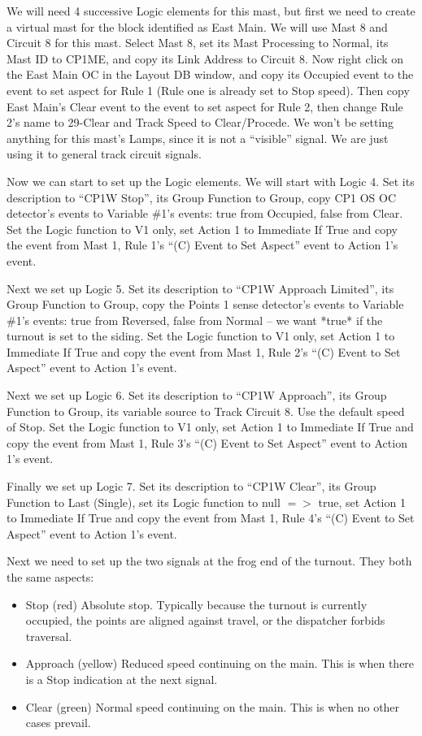 We will need 4 successive Logic elements for this mast, but first we need to 
create a virtual mast for the block identified as East Main.  We will use Mast 
8 and Circuit 8 for this mast.  Select Mast 8, set its Mast Processing to 
Normal, its Mast ID to CP1ME, and copy its Link Address to Circuit 8.  Now 
right click on the East Main OC in the Layout DB window, and copy its Occupied 
event to the event to set aspect for Rule 1 (Rule one is already set to Stop 
speed).  Then copy East Main's Clear event to the event to set aspect for Rule 
2, then change Rule 2's name to 29-Clear and Track Speed to Clear/Procede.  We 
won't be setting anything for this mast's Lamps, since it is not a ``visible'' 
signal.  We are just using it to general track circuit signals.

Now we can start to set up the Logic elements. We will start with Logic 4. Set
its description to ``CP1W Stop'', its Group Function to Group, copy CP1 OS OC
detector's events to Variable \#1's events: true from Occupied, false from
Clear. Set the Logic function to V1 only, set Action 1 to Immediate If True
and copy the event from Mast 1, Rule 1's ``(C) Event to Set Aspect'' event to 
Action 1's event.

Next we set up Logic 5. Set its description to ``CP1W Approach Limited'', its 
Group Function to Group, copy the Points 1 sense detector's events to Variable 
\#1's events: true from Reversed, false from Normal -- we want *true* if the 
turnout is set to the siding. Set the Logic function to V1 only, set Action 1 
to Immediate If True  and copy the event from Mast 1, Rule 2's ``(C) Event to 
Set Aspect'' event to Action 1's event.

Next we set up Logic 6. Set its description to ``CP1W Approach'', its Group 
Function to Group, its variable source to Track Circuit 8.  Use the default 
speed of Stop.  Set the Logic function to V1 only, set Action 1 to Immediate 
If True  and copy the event from Mast 1, Rule 3's ``(C) Event to Set Aspect'' 
event to Action 1's event.

Finally we set up Logic 7. Set its description to ``CP1W Clear'', its Group 
Function to Last (Single), set its Logic function to null $=>$ true, set Action 
1 to Immediate If True  and copy the event from Mast 1, Rule 4's ``(C) Event 
to Set Aspect'' event to Action 1's event.

Next we need to set up the two signals at the frog end of the turnout.  They 
both the same aspects:

\begin{itemize}
\item Stop (red) Absolute stop.  Typically because the turnout is currently 
occupied, the points are aligned against travel, or the dispatcher forbids 
traversal.
\item Approach (yellow) Reduced speed continuing on the main.  This is when 
there is a Stop indication at the next signal.
\item  Clear (green) Normal speed continuing on the main.  This is when no 
other cases prevail.
\end{itemize}

